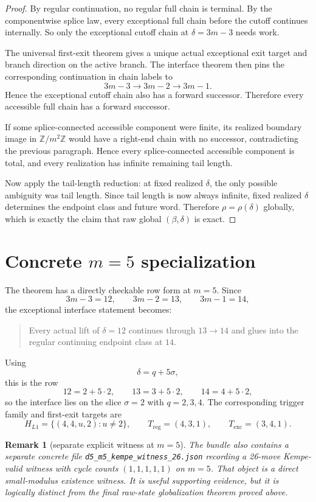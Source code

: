 \documentclass[11pt]{article}
\newtheorem{remark}[theorem]{Remark}
\begin{document}
\begin{proof}
By regular continuation, no regular full chain is terminal.
By the componentwise splice law, every exceptional full chain before the cutoff
continues internally.
So only the exceptional cutoff chain at $\delta=3m-3$ needs work.

The universal first-exit theorem gives a unique actual exceptional exit target
and branch direction on the active branch. The interface theorem then pins the
corresponding continuation in chain labels to
\[
3m-3 \to 3m-2 \to 3m-1.
\]
Hence the exceptional cutoff chain also has a forward successor.
Therefore every accessible full chain has a forward successor.

If some splice-connected accessible component were finite, its realized
boundary image in $\mathbb Z/m^2\mathbb Z$ would have a right-end chain with no
successor, contradicting the previous paragraph. Hence every splice-connected
accessible component is total, and every realization has infinite remaining
tail length.

Now apply the tail-length reduction: at fixed realized $\delta$, the only
possible ambiguity was tail length. Since tail length is now always infinite,
fixed realized $\delta$ determines the endpoint class and future word.
Therefore $\rho=\rho(\delta)$ globally, which is exactly the claim that raw
global $(\beta,\delta)$ is exact.
\end{proof}

\section{Concrete $m=5$ specialization}

The theorem has a directly checkable row form at $m=5$.
Since
\[
3m-3=12,
\qquad
3m-2=13,
\qquad
3m-1=14,
\]
the exceptional interface statement becomes:
\begin{quote}
Every actual lift of $\delta=12$ continues through $13\to 14$ and glues into
the regular continuing endpoint class at $14$.
\end{quote}

Using
\[
\delta=q+5\sigma,
\]
this is the row
\[
12=2+5\cdot 2,
\qquad
13=3+5\cdot 2,
\qquad
14=4+5\cdot 2,
\]
so the interface lies on the slice $\sigma=2$ with $q=2,3,4$.
The corresponding trigger family and first-exit targets are
\[
H_{L1}=\{(4,4,u,2):u\neq 2\},
\qquad
T_{\mathrm{reg}}=(4,3,1),
\qquad
T_{\mathrm{exc}}=(3,4,1).
\]

\begin{remark}[separate explicit witness at $m=5$]
The bundle also contains a separate concrete file
\texttt{d5\_m5\_kempe\_witness\_26.json} recording a 26-move Kempe-valid witness
with cycle counts $(1,1,1,1,1)$ on $m=5$.
That object is a direct small-modulus existence witness.
It is useful supporting evidence, but it is logically distinct from the final
raw-state globalization theorem proved above.
\end{remark}
\end{document}
